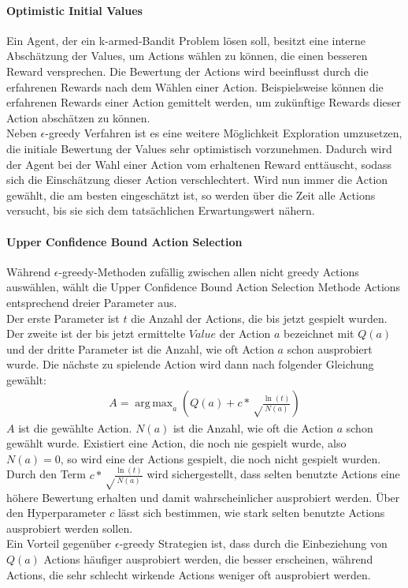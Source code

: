 \documentclass[11pt]{scrartcl}
\DeclareMathOperator*{\argmax}{arg\,max}
\begin{document}
\paragraph{Optimistic Initial Values}
Ein Agent, der ein k-armed-Bandit Problem lösen soll, besitzt eine interne Abschätzung der
Values, um Actions wählen zu können, die einen besseren Reward versprechen. Die
Bewertung der Actions wird beeinflusst durch die erfahrenen Rewards nach dem Wählen einer
Action. Beispielsweise können die erfahrenen Rewards einer Action gemittelt werden, um
zukünftige Rewards dieser Action abschätzen zu können.\\
Neben $\epsilon$-greedy Verfahren ist es eine weitere Möglichkeit Exploration umzusetzen,
die initiale Bewertung der Values sehr optimistisch vorzunehmen. Dadurch wird der Agent
bei der Wahl einer Action vom erhaltenen Reward \grqq enttäuscht\grqq, sodass sich die
Einschätzung dieser Action verschlechtert. Wird nun immer die Action gewählt, die am
besten eingeschätzt ist, so werden über die Zeit alle Actions versucht, bis sie sich dem
tatsächlichen Erwartungswert nähern.

\paragraph{Upper Confidence Bound Action Selection}
Während $\epsilon$-greedy-Methoden zufällig zwischen allen nicht greedy Actions
auswählen, wählt die Upper Confidence Bound Ac\-tion Selection Methode Actions entsprechend
dreier Parameter aus.\\
Der erste Parameter ist $t$ die Anzahl der Actions, die bis jetzt gespielt wurden. Der
zweite ist der bis jetzt ermittelte $Value$ der Action $a$ bezeichnet mit $Q(a)$ und der
dritte Parameter ist die Anzahl, wie oft Action $a$ schon ausprobiert wurde. Die nächste
zu spielende Action wird dann nach folgender Gleichung gewählt:
\begin{align}
A = \argmax_a\left( Q(a) + c*\sqrt\frac{\ln(t)}{N(a)} \right)
\end{align}
\noindent
$A$ ist die gewählte Action. $N(a)$ ist die Anzahl, wie oft die Action $a$ schon gewählt
wurde. Existiert eine Action, die noch nie gespielt wurde, also $N(a)=0$, so wird eine der
Actions gespielt, die noch nicht gespielt wurden. Durch den Term
$c*\sqrt\frac{\ln(t)}{N(a)}$ wird sichergestellt, dass selten benutzte Actions eine höhere
Bewertung erhalten und damit wahrscheinlicher ausprobiert werden. Über den Hyperparameter
$c$ lässt sich bestimmen, wie stark selten benutzte Actions ausprobiert werden sollen.\\
Ein Vorteil gegenüber $\epsilon$-greedy Strategien ist, dass durch die Einbeziehung von
$Q(a)$ Actions häufiger ausprobiert werden, die besser erscheinen, während Actions, die
sehr schlecht wirkende Actions weniger oft ausprobiert werden.
\end{document}
